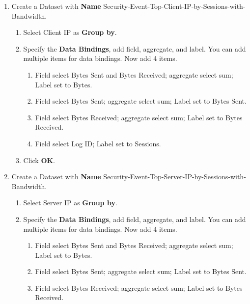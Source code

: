 \begin{description}
\begin{enumerate}
\begin{enumerate}
\begin{enumerate}
                \item	Field select Log ID; Label set to Sessions.
            \end{enumerate}
            \item	Click \textbf{OK}.
        \end{enumerate}
        \item Create a Dataset with \textbf{Name} Security-Event-Top-Client-IP-by-Sessions-with-Bandwidth.
        \begin{enumerate}
            \item	Select Client IP as \textbf{Group by}. 
            \item	Specify the \textbf{Data Bindings}, add field, aggregate, and label. You can add multiple items for data bindings. Now add 4 items. 
            \begin{enumerate}
                \item	Field select Bytes Sent and Bytes Received; aggregate select sum; Label set to Bytes. 
                \item	Field select Bytes Sent; aggregate select sum; Label set to Bytes Sent. 
                \item	Field select Bytes Received; aggregate select sum; Label set to Bytes Received. 
                \item	Field select Log ID; Label set to Sessions.
            \end{enumerate}
            \item	Click \textbf{OK}.
        \end{enumerate}
        \item Create a Dataset with \textbf{Name} Security-Event-Top-Server-IP-by-Sessions-with-Bandwidth.
        \begin{enumerate}
            \item	Select Server IP as \textbf{Group by}. 
            \item	Specify the \textbf{Data Bindings}, add field, aggregate, and label. You can add multiple items for data bindings. Now add 4 items. 
            \begin{enumerate}
                \item	Field select Bytes Sent and Bytes Received; aggregate select sum; Label set to Bytes. 
                \item	Field select Bytes Sent; aggregate select sum; Label set to Bytes Sent. 
                \item	Field select Bytes Received; aggregate select sum; Label set to Bytes Received. 

\end{enumerate}
\end{enumerate}
\end{enumerate}
\end{description}
